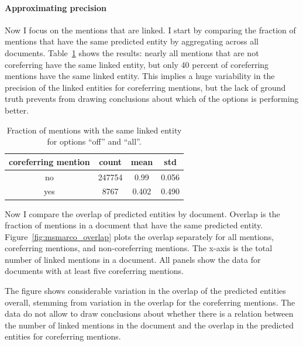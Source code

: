 \documentclass[a4paper,11pt]{article}
\numberwithin{equation}{section} %
\begin{document}
\paragraph{Approximating precision}
Now I focus on the mentions that are linked. I start by comparing the fraction of mentions that have the same predicted entity by aggregating across all documents. Table~\ref{tab:performance_msmarco_avg} shows the results: nearly all mentions that are not coreferring have the same linked entity, but only 40 percent of coreferring mentions have the same linked entity. This implies a huge variability in the precision of the linked entities for coreferring mentions, but the lack of ground truth prevents from drawing conclusions about which of the options is performing better. 

\begin{table}
 \begin{tabular}{c c c c}
 \hline
 coreferring mention & count & mean & std \\
 \hline 
 no & 247754 & 0.99 & 0.056  \\  
 yes & 8767 & 0.402 & 0.490 \\ 
\hline 
\end{tabular}
\caption{Fraction of mentions with the same linked entity for options ``off'' and ``all''.}
\label{tab:performance_msmarco_avg}
\end{table}

Now I compare the overlap of predicted entities by document. Overlap is the fraction of mentions in a document that have the same predicted entity. 
Figure~\ref{fig:msmarco_overlap} plots the overlap separately for all mentions, coreferring mentions, and non-coreferring mentions. The x-axis is the total number of linked mentions in a document.
All panels show the data for documents with at least five coreferring mentions.

The figure shows considerable variation in the overlap of the predicted entities overall, stemming from variation in the overlap for the coreferring mentions. The data do not allow to draw conclusions about whether there is a relation between the number of linked mentions in the document and the overlap in the predicted entities for coreferring mentions.
\end{document}
